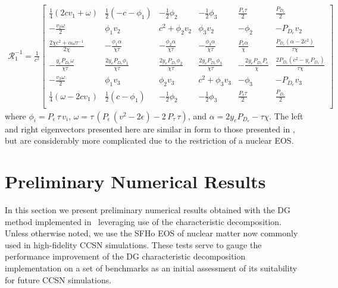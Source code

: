 \documentclass[onecolumn]{aastex62}
\begin{document}
\begin{align*}
  \mathcal{R}_{1}^{-1} = \frac{1}{c^2}
  \left[
  \begin{array}{cccccc}
   \frac{1}{4} (2 c  v_{1}+\omega ) & \frac{1}{2} (-c- \phi_{1} ) & -\frac{1}{2} \phi_{2}
    & -\frac{1}{2} \phi_{3}  & \frac{P_{\epsilon} \tau }{2} & \frac{P_{D_{e}}}{2}
     \\
   -\frac{v_{2} \omega }{2} & \phi_{1} v_{2}  & c^2+\phi_{2} v_{2}  &
     \phi_{3} v_{2}  & -\phi_{2}  & -P_{D_{e}} v_{2}
     \\
   \frac{2 \chi  c^2+\alpha  \omega \tau^{-1} }{2 \chi } & -\frac{\phi_{1} \alpha  }{\chi \tau } &
     -\frac{\phi_{2} \alpha  }{\chi \tau } & -\frac{\phi_{3} \alpha }{\chi \tau } &
     \frac{P_{\epsilon} \alpha }{\chi } & \frac{P_{D_{e}} \left(\alpha -2 c^2\right)}{\tau \chi }
      \\
   -\frac{y_{e} P_{D_{e}} \omega }{\chi \tau } & \frac{2 y_{e} P_{D_{e}} \phi_{1} }{\chi \tau } & \frac{2 y_{e} P_{D_{e}}
     \phi_{2} }{\chi \tau} & \frac{2 y_{e} P_{D_{e}} \phi_{3} }{\chi \tau} & -\frac{2 y_{e}
     P_{D_{e}} P_{\epsilon} }{\chi } & \frac{2 P_{D_{e}} \left(c^2-y_{e} P_{D_{e}} \right)}{\tau  \chi }
      \\
   -\frac{v_{3} \omega }{2} & \phi_{1} v_{3}  & \phi_{2} v_{3}   &
     c^2+\phi_{3} v_{3}  & -\phi_{3}  & -P_{D_{e}} v_{3}
      \\
   \frac{1}{4} (\omega -2 c  v_{1}) & \frac{1}{2} (c-\phi_{1} ) & -\frac{1}{2} \phi_{2}
       & -\frac{1}{2} \phi_{3}  & \frac{P_{\epsilon} \tau }{2} & \frac{P_{D_{e}}}{2}
     \\
  \end{array}
  \right]
\end{align*}
where $\phi_{i} = P_{\epsilon}\,\tau\, v_{i}$,
$\omega = \tau\, (P_{\epsilon}\,(v^2 - 2\epsilon) - 2\,P_{\tau}\,\tau)$, and
$\alpha = 2 y_{e} P_{D_{e}} - \tau \chi$.
The left and right eigenvectors presented here are similar in form to those
presented in \citet{schaal:2015a}, but are considerably more complicated due to the
restriction of a nuclear EOS.

\section{Preliminary Numerical Results}
\label{sec:results}
In this section we present preliminary numerical results obtained with the DG
method implemented in \thornado\, leveraging use of the characteristic
decomposition. Unless otherwise noted, we use the SFHo EOS of
nuclear matter \citep{steiner:2013} now commonly used in high-fidelity CCSN simulations.
These tests serve to gauge the performance improvement of the
DG characteristic decomposition implementation on a set of benchmarks as an initial
assessment of its suitability for future CCSN simulations.
\end{document}
